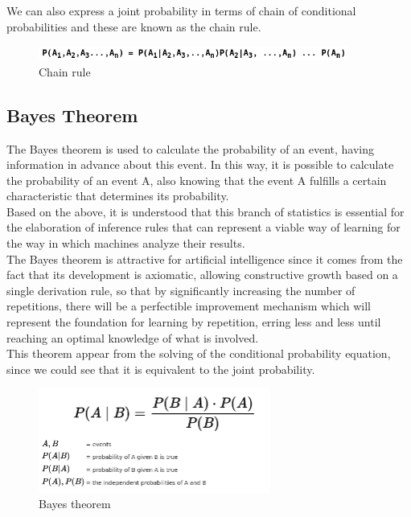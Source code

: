 \documentclass[sigconf,12pt,review=false,natbib=false]{acmart}
\begin{document}
We can also express a joint probability in terms of chain of conditional probabilities and these are
known as the chain rule. \\

\begin{figure}[h!]
    \centering
    \includegraphics[width=4in]{chain_rule}
    \caption{Chain rule}
    \label{fig:jcp_relationship}
\end{figure}

\subsection{Bayes Theorem}

The Bayes theorem is used to calculate the probability of an event, having information in advance
about this event. In this way, it is possible to calculate the probability of an event A, also
knowing that the event A fulfills a certain characteristic that determines its probability. \\

Based on the above, it is understood that this branch of statistics is essential for the elaboration
of inference rules that can represent a viable way of learning for the way in which machines analyze
their results. \\

The Bayes theorem is attractive for artificial intelligence since it comes from the fact that its
development is axiomatic, allowing constructive growth based on a single derivation rule, so that by
significantly increasing the number of repetitions, there will be a perfectible improvement mechanism
which will represent the foundation for learning by repetition, erring less and less until reaching
an optimal knowledge of what is involved. \\


This theorem appear from the solving of the conditional probability equation, since we could see
that it is equivalent to the joint probability. \\

\begin{figure}[h!]
    \centering
    \includegraphics[width=3in]{bayes}
    \caption{Bayes theorem}
    \label{fig:jcp_relationship}
\end{figure}
\end{document}
